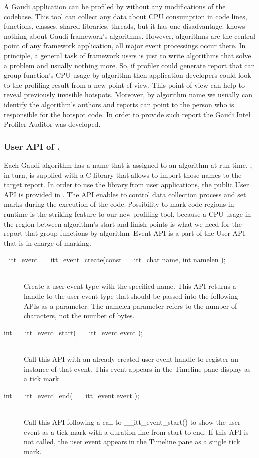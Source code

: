 \documentclass[a4paper]{jpconf}
\begin{document}
A Gaudi application can be profiled by \amp  without any modifications of the codebase.  This tool can collect any data 
about CPU consumption in code lines, functions, classes, shared libraries, threads, but it has one disadvantage. 
\amp knows nothing about Gaudi framework’s algorithms. However, algorithms are the central point of any framework 
application, all major event processings occur there. In principle, a general task of framework users is just to write 
algorithms that solve a problem and usually nothing more. So, if profiler could generate report that can group 
function’s CPU usage by algorithm then application developers could look to the profiling result 
from a new point of view. This point of view can help to reveal previously invisible hotspots. Moreover, 
by algorithm name we usually can identify the algorithm’s authors and reports can point to the person who is 
responsible for the hotspot code. In order to provide such report the Gaudi Intel Profiler Auditor was developed.

\subsubsection{User API of \iamp.}

Each Gaudi algorithm has a name that is assigned to an algorithm at run-time. \amp, in turn, is supplied with 
a C library that allows to import those names to the target report. In order to use the library from user applications, 
the public User API is provided in \amp. The API enables to control data collection process and set marks during 
the execution of the code. Possibility to mark code regions in runtime is the striking feature 
to our new profiling tool, because a CPU usage in the region between algorithm’s start and finish points is what we 
need for the report that group functions by algorithm. 
Event API is a part of the User API  that is in charge of marking.

\begin{description}
\item[\_itt\_event \_\_itt\_event\_create(const \_\_itt\_char \*name, int namelen );] \hfill \\
Create a user event type with the specified name. This API returns a handle to the user event type that should be 
passed into the following APIs as a parameter. The namelen parameter refers to the number of characters, 
not the number of bytes.

\item[int \_\_itt\_event\_start( \_\_itt\_event event );] \hfill \\
Call this API with an already created user event handle to register an instance of that event. This event appears 
in the Timeline pane display as a tick mark.

\item[int \_\_itt\_event\_end( \_\_itt\_event event );] \hfill \\
Call this API following a call to \_\_itt\_event\_start() to show the user event as a tick mark with a duration line 
from start to end. If this API is not called, the user event appears in the Timeline pane as a single tick mark.
\end{description}
\end{document}
